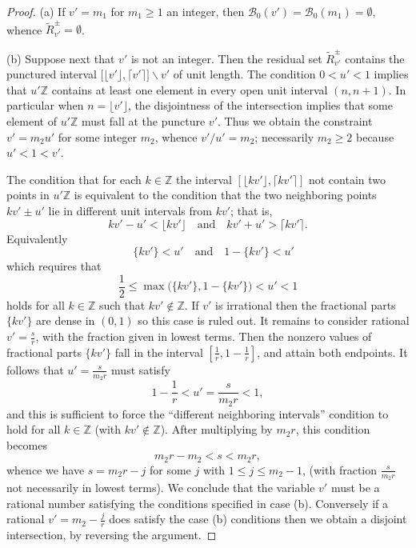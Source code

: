 \documentclass[12pt,letterpaper, reqno]{amsart}
\theoremstyle{definition}
\theoremstyle{remark}
\newcommand{\ZZ}{\ensuremath{\mathbb{Z}}}
\newcommand{\uu}{{u'}}
\newcommand{\vv}{{v'}}
\newcommand{\sB}{{\mathcal B}}
\newcommand{\floor}[1]{\lfloor{#1}\rfloor}
\newcommand{\ceil}[1]{\lceil{#1}\rceil}
\begin{document}
\begin{proof}
(a) If $\vv= {m_1}$ for $m_1 \ge 1$ an integer,
then  $\sB_0({\vv})=\sB_0(m_1) = \emptyset$, whence 
$\widetilde{R}_\vv^{\pm} = \emptyset$.

(b) Suppose next that ${\vv}$ is not an integer. Then the residual set $\widetilde{R}^\pm_\vv$ contains the punctured interval $\big[\floor\vv,\ceil\vv\big]\smallsetminus\vv$ of unit length.
The condition $0< {\uu} < 1$ implies that ${\uu} \ZZ$
contains  at least one element in every open unit interval $(n, n+1)$.
In particular when $n = \floor\vv$, the
disjointness of the intersection implies that some element of $\uu\ZZ$ must
fall at the puncture $\vv$.
Thus we obtain the constraint ${\vv} = m_2 {\uu}$ for some integer $m_2$,
whence  $\vv/\uu = {m_2}$; 
necessarily   $m_2 \ge 2$ because ${\uu} < 1 < {\vv}$.


The condition that for each $k \in \ZZ$ the interval $[ \floor{k\vv} ,\ceil{k\vv}]$  not contain
two points in ${\uu}\ZZ$ is  equivalent to the condition that the two neighboring points  
${k}{\vv}\pm {\uu}$
lie in different unit intervals from ${k}{\vv}$; that is,   
\[ 
k \vv- \uu <\floor{ k \vv} \quad\text{and}\quad  k \vv + \uu > \ceil{ {k}{\vv} } . \]
Equivalently
\[ 
\quad \{ k \vv\} < 
\uu \quad\text{and}\quad  1-\{ k \vv\} <\uu \]
which requires that
$$ 
\frac1 2 \leq  \max\Big(\{ {k}{\vv} \}, 1- \{ {k}{\vv} \} \Big)<  {\uu}   <1
$$
holds for all $k \in \ZZ$ such that $k\vv \not\in\ZZ$. If $\vv$ is irrational then the fractional parts $ \{ {k}{\vv} \}$
are dense in $(0,1)$ so this case is ruled out. 
It remains to consider rational  $\vv= \frac{s}{r}$, with the fraction given
in lowest terms. Then the nonzero values of fractional parts $\{ {k}{\vv} \}$ fall in the interval
$[ \frac{1}{r}, 1- \frac{1}{r} ]$, and attain both endpoints. It follows that 
 ${\uu} = \frac{s}{m_2 r}$  must satisfy
$$
1-\frac{1}{r} < {\uu} = \frac{s}{m_2 r} < 1,
$$
and this is sufficient  to force the ``different neighboring intervals'' condition to hold for all $k \in \ZZ$ (with $ k \vv\not\in\ZZ$).
After multiplying by $m_2 r$, this condition becomes
\[ m_2 r - m_2 < s < m_2 r,  \]
whence we have $s= m_2 r- j$ for some $j$ with $1 \le j \le m_2-1$, 
(with fraction $\frac{s}{m_2 r}$ not necessarily  in lowest terms).
We conclude that the variable $\vv$ must be a rational number satisfying the conditions
specified in case (b). Conversely if a rational $\vv= m_2-\frac{j}{r}$ does satisfy
the case (b) conditions then we obtain a disjoint intersection, by reversing the argument.
\end{proof}
\end{document}
